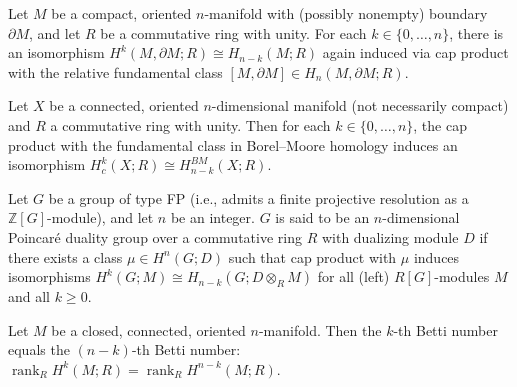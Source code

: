\begin{proposition}
Let $M$ be a compact, oriented $n$-manifold with (possibly nonempty) boundary $\partial M$, and let $R$ be a commutative ring with unity. For each $k \in \{0, \ldots, n\}$, there is an isomorphism
$
H^k(M, \partial M; R) \cong H_{n - k}(M; R)
$
again induced via cap product with the relative fundamental class $[M, \partial M] \in H_n(M, \partial M; R)$.
\end{proposition}

\begin{proposition}
Let $X$ be a connected, oriented $n$-dimensional manifold (not necessarily compact) and $R$ a commutative ring with unity. Then for each $k \in \{0,\ldots,n\}$, the cap product with the fundamental class in Borel–Moore homology induces an isomorphism
$
H_c^k(X; R) \cong H_{n - k}^{BM}(X; R).
$
\end{proposition}

\begin{proposition}
Let $G$ be a group of type FP (i.e., admits a finite projective resolution as a $\mathbb{Z}[G]$-module), and let $n$ be an integer. $G$ is said to be an $n$-dimensional Poincaré duality group over a commutative ring $R$ with dualizing module $D$ if there exists a class $\mu \in H^n(G; D)$ such that cap product with $\mu$ induces isomorphisms
$
H^k(G; M) \cong H_{n - k}(G; D \otimes_R M)
$
for all (left) $R[G]$-modules $M$ and all $k \geq 0$.
\end{proposition}

\begin{corollary}
Let $M$ be a closed, connected, oriented $n$-manifold. Then the $k$-th Betti number equals the $(n - k)$-th Betti number:
$
\operatorname{rank}_R H^k(M; R) = \operatorname{rank}_R H^{n-k}(M; R).
$
\end{corollary}





